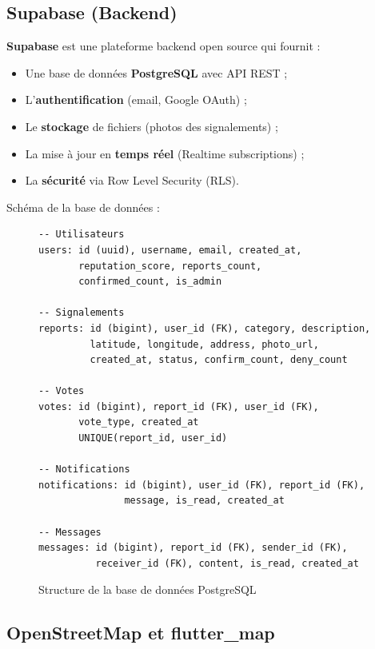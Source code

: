 \documentclass[12pt,a4paper]{report}
\begin{document}
\subsection{Supabase (Backend)}

\textbf{Supabase} est une plateforme backend open source qui fournit :
\begin{itemize}
    \item Une base de données \textbf{PostgreSQL} avec API REST ;
    \item L'\textbf{authentification} (email, Google OAuth) ;
    \item Le \textbf{stockage} de fichiers (photos des signalements) ;
    \item La mise à jour en \textbf{temps réel} (Realtime subscriptions) ;
    \item La \textbf{sécurité} via Row Level Security (RLS).
\end{itemize}

Schéma de la base de données :

\begin{figure}[H]
    \centering
    \begin{minipage}{0.9\textwidth}
    \begin{lstlisting}[style=codeblock, caption=Tables de la base Supabase]
-- Utilisateurs
users: id (uuid), username, email, created_at,
       reputation_score, reports_count,
       confirmed_count, is_admin

-- Signalements
reports: id (bigint), user_id (FK), category, description,
         latitude, longitude, address, photo_url,
         created_at, status, confirm_count, deny_count

-- Votes
votes: id (bigint), report_id (FK), user_id (FK),
       vote_type, created_at
       UNIQUE(report_id, user_id)

-- Notifications
notifications: id (bigint), user_id (FK), report_id (FK),
               message, is_read, created_at

-- Messages
messages: id (bigint), report_id (FK), sender_id (FK),
          receiver_id (FK), content, is_read, created_at
\end{lstlisting}
    \end{minipage}
    \caption{Structure de la base de données PostgreSQL}
    \label{fig:schema-bd}
\end{figure}

\subsection{OpenStreetMap et flutter\_map}
\end{document}
